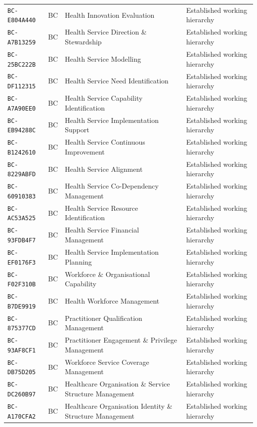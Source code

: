 \documentclass[11pt,a4paper,openany]{book}
\begin{document}
\begin{longtable}{@{}p{.19\linewidth}p{.12\linewidth}p{.39\linewidth}p{.24\linewidth}@{}}
\texttt{BC-E804A440} & BC & Health Innovation Evaluation & Established working hierarchy \\
\texttt{BC-A7B13259} & BC & Health Service Direction \& Stewardship & Established working hierarchy \\
\texttt{BC-25BC222B} & BC & Health Service Modelling & Established working hierarchy \\
\texttt{BC-DF112315} & BC & Health Service Need Identification & Established working hierarchy \\
\texttt{BC-A7A90EE0} & BC & Health Service Capability Identification & Established working hierarchy \\
\texttt{BC-EB94288C} & BC & Health Service Implementation Support & Established working hierarchy \\
\texttt{BC-B1242610} & BC & Health Service Continuous Improvement & Established working hierarchy \\
\texttt{BC-8229ABFD} & BC & Health Service Alignment & Established working hierarchy \\
\texttt{BC-60910383} & BC & Health Service Co-Dependency Management & Established working hierarchy \\
\texttt{BC-AC53A525} & BC & Health Service Resource Identification & Established working hierarchy \\
\texttt{BC-93FDB4F7} & BC & Health Service Financial Management & Established working hierarchy \\
\texttt{BC-EF0176F3} & BC & Health Service Implementation Planning & Established working hierarchy \\
\texttt{BC-F02F310B} & BC & Workforce \& Organisational Capability & Established working hierarchy \\
\texttt{BC-B7DE9919} & BC & Health Workforce Management & Established working hierarchy \\
\texttt{BC-875377CD} & BC & Practitioner Qualification Management & Established working hierarchy \\
\texttt{BC-93AF8CF1} & BC & Practitioner Engagement \& Privilege Management & Established working hierarchy \\
\texttt{BC-DB75D205} & BC & Workforce Service Coverage Management & Established working hierarchy \\
\texttt{BC-DC260B97} & BC & Healthcare Organisation \& Service Structure Management & Established working hierarchy \\
\texttt{BC-A170CFA2} & BC & Healthcare Organisation Identity \& Structure Management & Established working hierarchy \\

\end{longtable}
\end{document}
